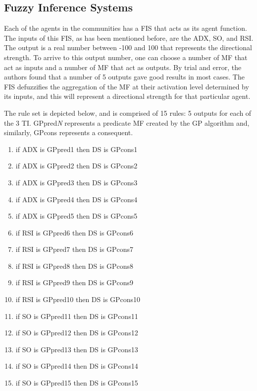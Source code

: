 \documentclass[a4paper,twoside]{article}
\begin{document}
\subsection{Fuzzy Inference Systems}

Each of the agents in the communities has a FIS that acts as its agent function. The inputs of this FIS, as has been mentioned before, are the ADX, SO, and RSI. The output is a real number between -100 and 100 that represents the directional strength. To arrive to this output number, one can choose a number of MF that act as inputs and a number of MF that act as outputs. By trial and error, the authors found that a number of 5 outputs gave good results in most cases. The FIS defuzzifies the aggregation of the MF at their activation level determined by its inputs, and this will represent a directional strength for that particular agent.

The rule set is depicted below, and is comprised of 15 rules: 5 outputs for each of the 3 TI. GPpred\textit{N} represents a predicate MF created by the GP algorithm and, similarly, GPcons represents a consequent.

\begin{enumerate}
\item if ADX is GPpred1 then DS is GPcons1
\item if ADX is GPpred2 then DS is GPcons2
\item if ADX is GPpred3 then DS is GPcons3
\item if ADX is GPpred4 then DS is GPcons4
\item if ADX is GPpred5 then DS is GPcons5

\item if RSI is GPpred6 then DS is GPcons6
\item if RSI is GPpred7 then DS is GPcons7
\item if RSI is GPpred8 then DS is GPcons8
\item if RSI is GPpred9 then DS is GPcons9
\item if RSI is GPpred10 then DS is GPcons10

\item if SO is GPpred11 then DS is GPcons11
\item if SO is GPpred12 then DS is GPcons12
\item if SO is GPpred13 then DS is GPcons13
\item if SO is GPpred14 then DS is GPcons14
\item if SO is GPpred15 then DS is GPcons15
\end{enumerate}
\end{document}
